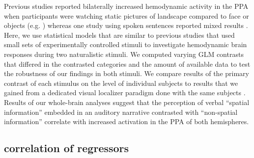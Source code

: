 \documentclass[english]{article}
\begin{document}




Previous studies reported bilaterally increased hemodynamic activity in the PPA
when participants were watching static pictures of landscape compared to face or
objects (e.g. \citep{epstein1998ppa, epstein1999parahippocampal}) whereas one
study using spoken sentences reported mixed results \citep{aziz2008modulation}.
Here, we use statistical models that are similar to previous studies that used
small sets of experimentally controlled stimuli to investigate hemodynamic brain
responses during two naturalistic stimuli.
We computed varying GLM contrasts that differed in the contrasted categories and
the amount of available data to test the robustness of our findings in both
stimuli.
We compare results of the primary contrast of each stimulus on the level of
individual subjects to results that we gained from a dedicated visual localizer
paradigm done with the same subjects \citep{sengupta2016extension}.
Results of our whole-brain analyses suggest that the perception of verbal
``spatial information'' embedded in an auditory narrative contrasted with
``non-spatial information'' correlate with increased activation in the PPA of
both hemispheres.

\subsection{correlation of regressors}
\end{document}

